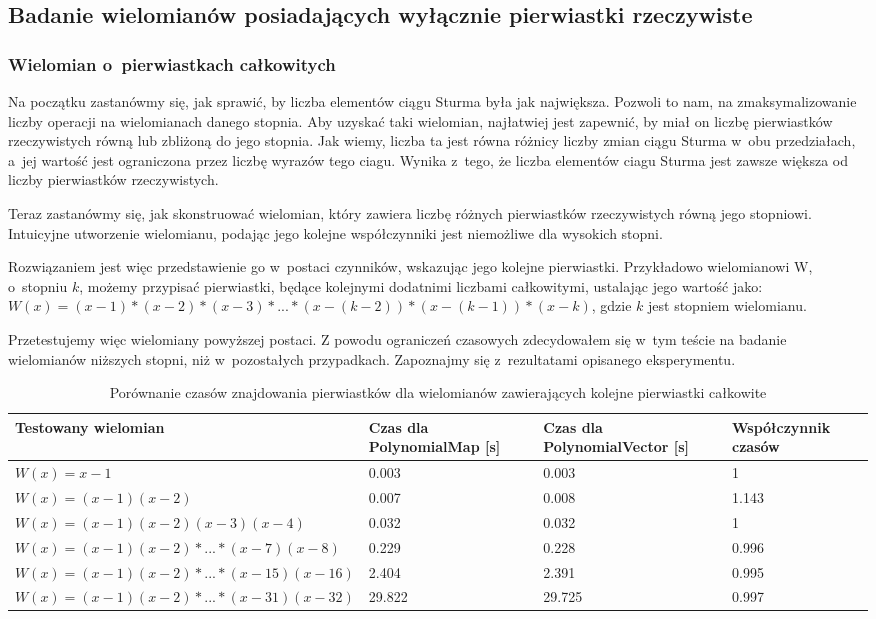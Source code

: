 \subsection{Badanie wielomianów posiadających wyłącznie pierwiastki rzeczywiste}

\subsubsection{Wielomian o~pierwiastkach całkowitych}

Na początku zastanówmy się, jak sprawić, by liczba elementów ciągu Sturma była jak największa. Pozwoli to nam, na zmaksymalizowanie liczby operacji na wielomianach danego stopnia. Aby uzyskać taki wielomian, najłatwiej jest zapewnić, by miał on liczbę pierwiastków rzeczywistych równą lub zbliżoną do jego stopnia. Jak wiemy, liczba ta jest równa różnicy liczby zmian ciągu Sturma w~obu przedziałach, a~jej wartość jest ograniczona przez liczbę wyrazów tego ciagu. Wynika z~tego, że liczba elementów ciagu Sturma jest zawsze większa od liczby pierwiastków rzeczywistych.

Teraz zastanówmy się, jak skonstruować wielomian, który zawiera liczbę różnych pierwiastków rzeczywistych równą jego stopniowi. Intuicyjne utworzenie wielomianu, podając jego kolejne współczynniki jest niemożliwe dla wysokich stopni.

Rozwiązaniem jest więc przedstawienie go w~postaci czynników, wskazując jego kolejne pierwiastki. Przykładowo wielomianowi W, o~stopniu $k$, możemy przypisać pierwiastki, będące kolejnymi dodatnimi liczbami całkowitymi, ustalając jego wartość jako: \\ $W(x)=(x-1)*(x-2)*(x-3)*...*(x-(k-2))*(x-(k-1))*(x-k)$, gdzie $k$ jest stopniem wielomianu.

Przetestujemy więc wielomiany powyższej postaci. Z powodu ograniczeń czasowych zdecydowałem się w~tym teście na badanie wielomianów niższych stopni, niż w~pozostałych przypadkach. Zapoznajmy się z~rezultatami opisanego eksperymentu.

\begin{table}[H]
	\begin{tabular}{ |p{4cm}|p{2.75cm}|p{2.75cm}|p{3.5cm}|} 
		\hline
		Testowany wielomian & Czas dla PolynomialMap [s] & Czas dla PolynomialVector [s] & Współczynnik czasów \\
		\hline
		$W(x) = x-1$ & 0.003 & 0.003 & 1 \\
		$W(x) = (x-1)(x-2)$ & 0.007 & 0.008 & 1.143 \\
		$W(x) = (x-1)(x-2)(x-3)(x-4)$ & 0.032 & 0.032 & 1 \\
		$W(x) = (x-1)(x-2)*...*(x-7)(x-8)$ & 0.229 & 0.228 & 0.996 \\
		$W(x) = (x-1)(x-2)*...*(x-15)(x-16)$ & 2.404 & 2.391 & 0.995 \\
		$W(x) = (x-1)(x-2)*...*(x-31)(x-32)$ & 29.822 & 29.725 & 0.997 \\
		\hline
	\end{tabular}
	\caption{Porównanie czasów znajdowania pierwiastków dla wielomianów zawierających kolejne pierwiastki całkowite}
\end{table}

